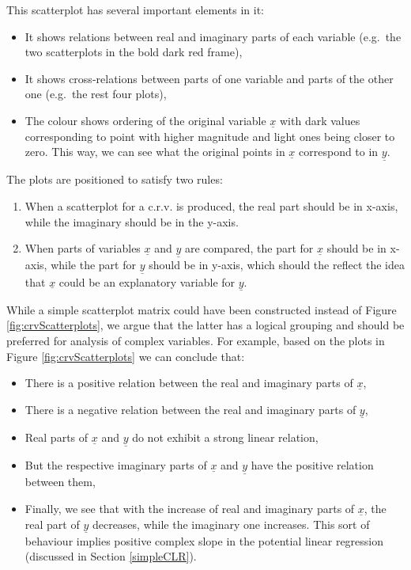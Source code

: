 \documentclass[
]{book}
\providecommand{\tightlist}{%
  \setlength{\itemsep}{0pt}\setlength{\parskip}{0pt}}
\begin{document}
This scatterplot has several important elements in it:

\begin{itemize}
\tightlist
\item
  It shows relations between real and imaginary parts of each variable (e.g.~the two scatterplots in the bold dark red frame),
\item
  It shows cross-relations between parts of one variable and parts of the other one (e.g.~the rest four plots),
\item
  The colour shows ordering of the original variable \(\underline{x}\) with dark values corresponding to point with higher magnitude and light ones being closer to zero. This way, we can see what the original points in \(\underline{x}\) correspond to in \(\underline{y}\).
\end{itemize}

The plots are positioned to satisfy two rules:

\begin{enumerate}
\def\labelenumi{\arabic{enumi}.}
\tightlist
\item
  When a scatterplot for a c.r.v. is produced, the real part should be in x-axis, while the imaginary should be in the y-axis.
\item
  When parts of variables \(\underline{x}\) and \(\underline{y}\) are compared, the part for \(\underline{x}\) should be in x-axis, while the part for \(\underline{y}\) should be in y-axis, which should the reflect the idea that \(\underline{x}\) could be an explanatory variable for \(\underline{y}\).
\end{enumerate}

While a simple scatterplot matrix could have been constructed instead of Figure \ref{fig:crvScatterplots}, we argue that the latter has a logical grouping and should be preferred for analysis of complex variables. For example, based on the plots in Figure \ref{fig:crvScatterplots} we can conclude that:

\begin{itemize}
\tightlist
\item
  There is a positive relation between the real and imaginary parts of \(\underline{x}\),
\item
  There is a negative relation between the real and imaginary parts of \(\underline{y}\),
\item
  Real parts of \(\underline{x}\) and \(\underline{y}\) do not exhibit a strong linear relation,
\item
  But the respective imaginary parts of \(\underline{x}\) and \(\underline{y}\) have the positive relation between them,
\item
  Finally, we see that with the increase of real and imaginary parts of \(\underline{x}\), the real part of \(\underline{y}\) decreases, while the imaginary one increases. This sort of behaviour implies positive complex slope in the potential linear regression (discussed in Section \ref{simpleCLR}).
\end{itemize}
\end{document}
